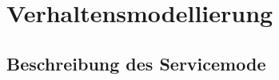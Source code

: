 

\section{Verhaltensmodellierung}\label{sec:verhaltensmodellierung}

\subsection{Beschreibung des Servicemode}

